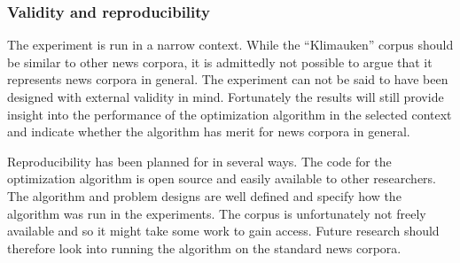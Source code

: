 \subsubsection{Validity and reproducibility}
The experiment is run in a narrow context. While the ``Klimauken'' corpus should be similar to other news corpora, it is admittedly not possible to argue that it represents news corpora in general. The experiment can not be said to have been designed with external validity in mind. Fortunately the results will still provide insight into the performance of the optimization algorithm in the selected context and indicate whether the algorithm has merit for news corpora in general.

Reproducibility has been planned for in several ways. The code for the optimization algorithm is open source and easily available to other researchers. The algorithm and problem designs are well defined and specify how the algorithm was run in the experiments. The corpus is unfortunately not freely available and so it might take some work to gain access. Future research should therefore look into running the algorithm on the standard news corpora.
